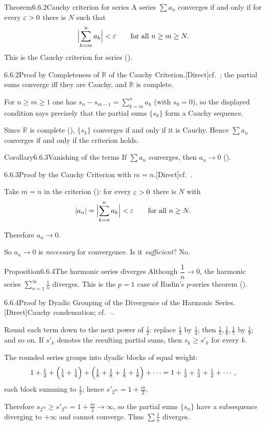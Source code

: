\documentclass[main.tex]{subfiles}
\begin{document}
\begin{Obj}{Theorem}{6.6.2}{Cauchy criterion for series}
A series $\sum a_n$ converges if and only if for every $\varepsilon>0$ there is $N$ such that
\[ \Bigl|\sum_{k=m}^{n}a_k\Bigr|<\varepsilon \qquad\text{for all } n\ge m\ge N . \]
This is the Cauchy criterion for series ().
\end{Obj}
\begin{Prf}{6.6.2}{Proof by Completeness of $\mathbb R$ of the Cauchy Criterion.}{[Direct]\quad cf.\ ; the partial sums converge iff they are Cauchy, and $\mathbb R$ is complete.}
\item For $n\ge m\ge1$ one has $s_n-s_{m-1}=\sum_{k=m}^{n}a_k$ (with $s_0=0$), so the displayed condition says precisely that the partial sums $\{s_k\}$ form a Cauchy sequence.
\item Since $\mathbb R$ is complete (), $\{s_k\}$ converges if and only if it is Cauchy. Hence $\sum a_n$ converges if and only if the criterion holds.
\end{Prf}

\begin{Obj}{Corollary}{6.6.3}{Vanishing of the terms}
If $\sum a_n$ converges, then $a_n\to0$ ().
\end{Obj}
\begin{Prf}{6.6.3}{Proof by the Cauchy Criterion with $m=n$.}{[Direct]\quad cf.\ .}
\item Take $m=n$ in the criterion (): for every $\varepsilon>0$ there is $N$ with
  \[ |a_n|=\Bigl|\sum_{k=n}^{n}a_k\Bigr|<\varepsilon\qquad\text{for all }n\ge N . \]
\item Therefore $a_n\to0$.
\end{Prf}

\noindent So $a_n\to0$ is \emph{necessary} for convergence. Is it \emph{sufficient}? No.

\begin{Obj}{Proposition}{6.6.4}{The harmonic series diverges}
Although $\dfrac{1}{n}\to0$, the harmonic series $\displaystyle\sum_{n=1}^\infty\frac1n$ diverges.
This is the $p=1$ case of Rudin's $p$-series theorem ().
\end{Obj}
\begin{Prf}{6.6.4}{Proof by Dyadic Grouping of the Divergence of the Harmonic Series.}{[Direct]\quad Cauchy condensation; cf.\ --.}
\item Round each term down to the next power of $\tfrac12$: replace $\tfrac13$ by $\tfrac14$; then $\tfrac15,\tfrac16,\tfrac17$ by $\tfrac18$; and so on. If $s'_k$ denotes the resulting partial sums, then $s_k\ge s'_k$ for every $k$.
\item The rounded series groups into dyadic blocks of equal weight:
  \[ 1+\tfrac12+\Bigl(\tfrac14+\tfrac14\Bigr)+\Bigl(\tfrac18+\tfrac18+\tfrac18+\tfrac18\Bigr)+\cdots
     = 1+\tfrac12+\tfrac12+\tfrac12+\cdots , \]
  each block summing to $\tfrac12$; hence $s'_{2^m}=1+\tfrac{m}{2}$.
\item Therefore $s_{2^m}\ge s'_{2^m}=1+\tfrac{m}{2}\to\infty$, so the partial sums $\{s_n\}$ have a subsequence diverging to $+\infty$ and cannot converge. Thus $\textstyle\sum\frac1n$ diverges.
\end{Prf}
\end{document}
